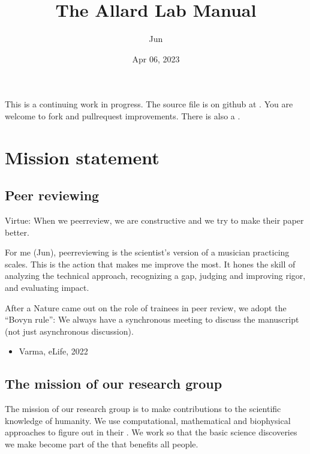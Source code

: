 \documentclass[letterpaper,10pt,english]{sphinxmanual}
\title{The Allard Lab Manual}
\date{Apr 06, 2023}
\author{Jun}
\begin{document}
\pagestyle{empty}
\sphinxmaketitle
\pagestyle{plain}
\sphinxtableofcontents
\pagestyle{normal}
\label{\detokenize{index::doc}}


\sphinxAtStartPar
This is a continuing work in progress.
The source file is on github at .
You are welcome to fork and pull\sphinxhyphen{}request improvements.
There is also a .


\chapter{Mission statement}
\label{\detokenize{01OurMission:mission-statement}}\label{\detokenize{01OurMission::doc}}

\section{Peer reviewing}
\label{\detokenize{PeerReviewing:peer-reviewing}}\label{\detokenize{PeerReviewing:id1}}\label{\detokenize{PeerReviewing::doc}}
\sphinxAtStartPar
Virtue: When we peer\sphinxhyphen{}review, we are constructive and we try to make their paper better.

\sphinxAtStartPar
For me (Jun), peer\sphinxhyphen{}reviewing is the scientist’s version of a musician practicing scales. This is the action that makes me improve the most. It hones the skill of analyzing the technical approach, recognizing a gap, judging and improving rigor, and evaluating impact.

\sphinxAtStartPar
After a Nature  came out on the role of trainees in peer review, we adopt the “Bovyn rule”: We always have a synchronous meeting to discuss the manuscript (not just asynchronous discussion).
\begin{itemize}
\item {} 
\sphinxAtStartPar
Varma,  eLife, 2022

\end{itemize}


\section{The mission of our research group}
\label{\detokenize{01OurMission:the-mission-of-our-research-group}}
\sphinxAtStartPar
The mission of our research group is to make  contributions to the scientific knowledge of humanity.
We use computational, mathematical and biophysical approaches to figure out  in their .
We work so that the basic science discoveries we make become part of the  that benefits all people.
\end{document}
